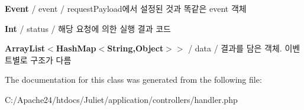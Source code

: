 \par
 {\bfseries Event} / event / request\-Payload에서 설정된 것과 똑같은 event 객체\par
 {\bfseries Int} / status / 해당 요청에 의한 실행 결과 코드\par
 {\bfseries Array\-List$<$Hash\-Map$<$\-String,\-Object$>$$>$} / data / 결과를 담은 객체. 이벤트별로 구조가 다름 \par
 

The documentation for this class was generated from the following file\-:\begin{DoxyCompactItemize}
\item 
C\-:/\-Apache24/htdocs/\-Juliet/application/controllers/handler.\-php\end{DoxyCompactItemize}

